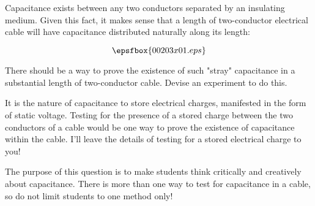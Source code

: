 

Capacitance exists between any two conductors separated by an insulating medium.  Given this fact, it makes sense that a length of two-conductor electrical cable will have capacitance distributed naturally along its length:

$$\epsfbox{00203x01.eps}$$

There should be a way to prove the existence of such "stray" capacitance in a substantial length of two-conductor cable.  Devise an experiment to do this.







It is the nature of capacitance to store electrical charges, manifested in the form of static voltage.  Testing for the presence of a stored charge between the two conductors of a cable would be one way to prove the existence of capacitance within the cable.  I'll leave the details of testing for a stored electrical charge to you!







The purpose of this question is to make students think critically and creatively about capacitance.  There is more than one way to test for capacitance in a cable, so do not limit students to one method only!




